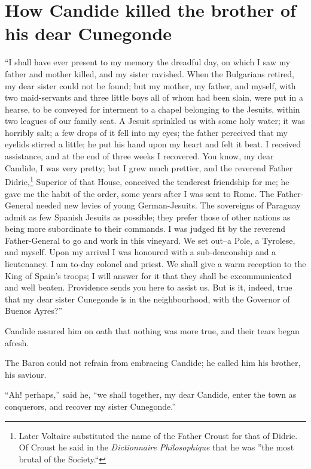 \vspace{1cm}
\begingroup
\let\clearpage\relax
\chapter{How Candide killed the brother of his dear Cunegonde}
\endgroup
\vspace{-1cm}
\lettrine[lraise=0.1,nindent=0em,slope=-.5em]{``I}{} shall have ever present to my memory the dreadful day, on which I saw my father and mother killed, and my sister ravished. When the Bulgarians retired, my dear sister could not be found; but my mother, my father, and myself, with two maid-servants and three little boys all of whom had been slain, were put in a hearse, to be conveyed for interment to a chapel belonging to the Jesuits, within two leagues of our family seat. A Jesuit sprinkled us with some holy water; it was horribly salt; a few drops of it fell into my eyes; the father perceived that my eyelids stirred a little; he put his hand upon my heart and felt it beat. I received assistance, and at the end of three weeks I recovered. You know, my dear Candide, I was very pretty; but I grew much prettier, and the reverend Father Didrie,\footnote{Later Voltaire substituted the name of the Father Croust for that of Didrie. Of Croust he said in the \textit{Dictionnaire Philosophique} that he was ''the most brutal of the Society.``} Superior of that House, conceived the tenderest friendship for me; he gave me the habit of the order, some years after I was sent to Rome. The Father-General needed new levies of young German-Jesuits. The sovereigns of Paraguay admit as few Spanish Jesuits as possible; they prefer those of other nations as being more subordinate to their commands. I was judged fit by the reverend Father-General to go and work in this vineyard. We set out--a Pole, a Tyrolese, and myself. Upon my arrival I was honoured with a sub-deaconship and a lieutenancy. I am to-day colonel and priest. We shall give a warm reception to the King of Spain's troops; I will answer for it that they shall be excommunicated and well beaten. Providence sends you here to assist us. But is it, indeed, true that my dear sister Cunegonde is in the neighbourhood, with the Governor of Buenos Ayres?''

Candide assured him on oath that nothing was more true, and their tears began afresh.

The Baron could not refrain from embracing Candide; he called him his brother, his saviour.

``Ah! perhaps,'' said he, ``we shall together, my dear Candide, enter the town as conquerors, and recover my sister Cunegonde.''

